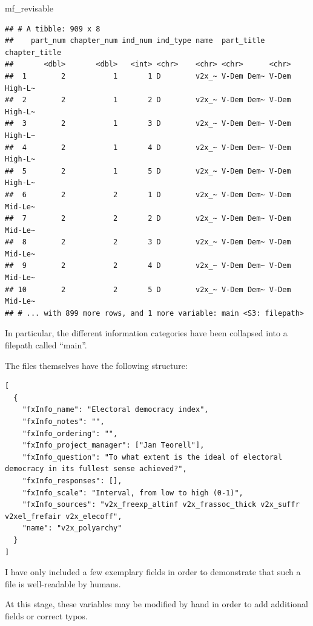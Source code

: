 \documentclass[]{report}
\newenvironment{Shaded}{\begin{snugshade}}{\end{snugshade}}
\newcommand{\NormalTok}[1]{#1}
\theoremstyle{definition}
\theoremstyle{definition}
\theoremstyle{definition}
\theoremstyle{remark}
\begin{document}
\begin{Shaded}
\begin{Highlighting}[]
\NormalTok{mf_revisable}
\end{Highlighting}
\end{Shaded}

\begin{verbatim}
## # A tibble: 909 x 8
##    part_num chapter_num ind_num ind_type name  part_title chapter_title
##       <dbl>       <dbl>   <int> <chr>    <chr> <chr>      <chr>        
##  1        2           1       1 D        v2x_~ V-Dem Dem~ V-Dem High-L~
##  2        2           1       2 D        v2x_~ V-Dem Dem~ V-Dem High-L~
##  3        2           1       3 D        v2x_~ V-Dem Dem~ V-Dem High-L~
##  4        2           1       4 D        v2x_~ V-Dem Dem~ V-Dem High-L~
##  5        2           1       5 D        v2x_~ V-Dem Dem~ V-Dem High-L~
##  6        2           2       1 D        v2x_~ V-Dem Dem~ V-Dem Mid-Le~
##  7        2           2       2 D        v2x_~ V-Dem Dem~ V-Dem Mid-Le~
##  8        2           2       3 D        v2x_~ V-Dem Dem~ V-Dem Mid-Le~
##  9        2           2       4 D        v2x_~ V-Dem Dem~ V-Dem Mid-Le~
## 10        2           2       5 D        v2x_~ V-Dem Dem~ V-Dem Mid-Le~
## # ... with 899 more rows, and 1 more variable: main <S3: filepath>
\end{verbatim}

In particular, the different information categories have been collapsed
into a filepath called ``main''.

The files themselves have the following structure:

\begin{verbatim}
[
  {
    "fxInfo_name": "Electoral democracy index",
    "fxInfo_notes": "",
    "fxInfo_ordering": "",
    "fxInfo_project_manager": ["Jan Teorell"],
    "fxInfo_question": "To what extent is the ideal of electoral democracy in its fullest sense achieved?",
    "fxInfo_responses": [],
    "fxInfo_scale": "Interval, from low to high (0-1)",
    "fxInfo_sources": "v2x_freexp_altinf v2x_frassoc_thick v2x_suffr v2xel_frefair v2x_elecoff",
    "name": "v2x_polyarchy"
  }
]
\end{verbatim}

I have only included a few exemplary fields in order to demonstrate that
such a file is well-readable by humans.

At this stage, these variables may be modified by hand in order to add
additional fields or correct typos.
\end{document}
